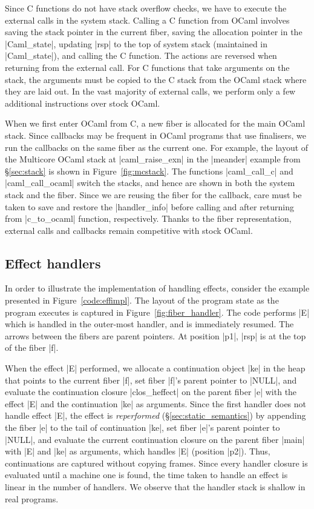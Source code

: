 \documentclass[sigplan,10pt,review,anonymous]{acmart}\settopmatter{printfolios=true,printccs=false,printacmref=false}
\begin{document}
Since C functions do not have stack overflow checks, we have to execute the
external calls in the system stack. Calling a C function from OCaml involves
saving the stack pointer in the current fiber, saving the
allocation pointer in the |Caml_state|, updating |rsp| to the top of system
stack (maintained in |Caml_state|), and calling the C function. The actions are
reversed when returning from the external call. For C
functions that take arguments on the stack, the arguments must be copied to the
C stack from the OCaml stack where they are laid out. In the vast majority of
external calls, we perform only a few additional instructions over stock OCaml.

When we first enter OCaml from C, a new fiber is allocated for the main OCaml
stack. Since callbacks may be frequent in OCaml programs that use finalisers,
we run the callbacks on the same fiber as the current one. For example, the
layout of the Multicore OCaml stack at |caml_raise_exn| in the |meander|
example from \S\ref{sec:stack} is shown in Figure~\ref{fig:mcstack}. The
functions |caml_call_c| and |caml_call_ocaml| switch the stacks, and hence are
shown in both the system stack and the fiber. Since we are reusing the fiber
for the callback, care must be taken to save and restore the |handler_info|
before calling and after returning from |c_to_ocaml| function, respectively.
Thanks to the fiber representation, external calls and callbacks remain
competitive with stock OCaml.

\vspace{-2mm}
\subsection{Effect handlers}
\label{sec:effimpl}

In order to illustrate the implementation of handling effects, consider the
example presented in Figure~\ref{code:effimpl}. The layout of the program state
as the program executes is captured in Figure~\ref{fig:fiber_handler}. The code
performs |E| which is handled in the outer-most handler, and is immediately
resumed. The arrows between the fibers are parent pointers. At position |p1|,
|rsp| is at the top of the fiber |f|.

When the effect |E| performed, we allocate a continuation object |ke| in the
heap that points to the current fiber |f|, set fiber |f|'s parent pointer to
|NULL|, and evaluate the continuation closure |clos_heffect| on the parent
fiber |e| with the effect |E| and the continuation |ke| as arguments. Since the
first handler does not handle effect |E|, the effect is \emph{reperformed}
(\S\ref{sec:static_semantics}) by appending the fiber |e| to the tail of
continuation |ke|, set fiber |e|'s parent pointer to |NULL|, and evaluate the
current continuation closure on the parent fiber |main| with |E| and |ke| as
arguments, which handles |E| (position |p2|). Thus, continuations are captured
without copying frames. Since every handler closure is evaluated until a
machine one is found, the time taken to handle an effect is linear in the
number of handlers. We observe that the handler stack is shallow in real
programs.
\end{document}
